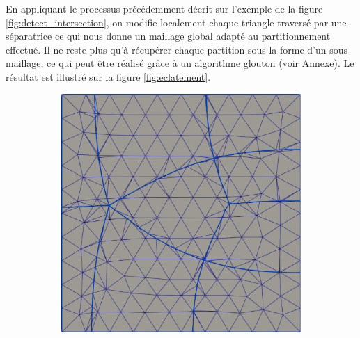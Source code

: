 En appliquant le processus précédemment décrit sur l'exemple de la figure \ref{fig:detect_intersection}, on modifie localement chaque triangle traversé par une séparatrice ce qui nous donne un maillage global adapté au partitionnement effectué. Il ne reste plus qu'à récupérer chaque partition sous la forme d'un sous-maillage, ce qui peut être réalisé grâce à un algorithme glouton (voir Annexe). Le résultat est illustré sur la figure \ref{fig:eclatement}.

\begin{figure}[h!]
\centering
\begin{subfigure}{0.49\textwidth}
    \includegraphics[width=\textwidth]{images/eclatement_2.pdf}
\end{subfigure}
\hfill
\begin{subfigure}{0.49\textwidth}

\end{subfigure}
\end{figure}
